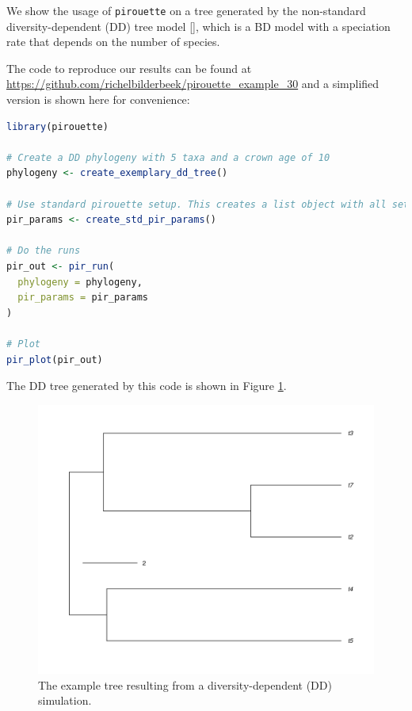 We show the usage of \verb;pirouette; on a tree generated 
by the non-standard diversity-dependent (DD) tree 
model [\citep{DDD, etienne2012diversity}],
which is a BD model with a speciation rate that depends on the number of species. 

The code to reproduce our results can be found at  
\url{https://github.com/richelbilderbeek/pirouette_example_30}
and a simplified version is shown here for convenience:

\begin{lstlisting}[language=R]
library(pirouette)

# Create a DD phylogeny with 5 taxa and a crown age of 10
phylogeny <- create_exemplary_dd_tree()

# Use standard pirouette setup. This creates a list object with all settings for generating the alignment, the inference using BEAST2, the twinning parameters to generate the twin tree and infer it using BEAST2, and the error measure  
pir_params <- create_std_pir_params()

# Do the runs
pir_out <- pir_run(
  phylogeny = phylogeny,
  pir_params = pir_params
)

# Plot
pir_plot(pir_out)
\end{lstlisting}

The DD tree generated by this code is shown in Figure \ref{fig:dd_tree}. 

\begin{figure}[H]
  \includegraphics[width=\textwidth]{figure_2.png}
  \caption{
    The example tree resulting from a diversity-dependent (DD) simulation.
  }
  \label{fig:dd_tree}
\end{figure}

